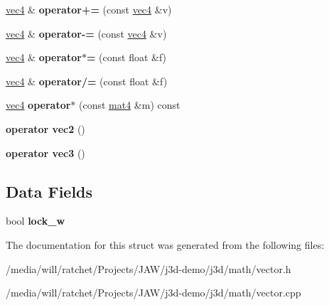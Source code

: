 \begin{DoxyCompactItemize}
\item 
\hypertarget{structj3d_1_1vec4_a8c4603ff2b8277bd6a4360ad5be1afa4}{}\hyperlink{structj3d_1_1vec4}{vec4} \& {\bfseries operator+=} (const \hyperlink{structj3d_1_1vec4}{vec4} \&v)\label{structj3d_1_1vec4_a8c4603ff2b8277bd6a4360ad5be1afa4}

\item 
\hypertarget{structj3d_1_1vec4_a3f19a869c701921bdc99595c0d4f1bd0}{}\hyperlink{structj3d_1_1vec4}{vec4} \& {\bfseries operator-\/=} (const \hyperlink{structj3d_1_1vec4}{vec4} \&v)\label{structj3d_1_1vec4_a3f19a869c701921bdc99595c0d4f1bd0}

\item 
\hypertarget{structj3d_1_1vec4_a26da4982d3addbd7e8ab0f91f7da7bf1}{}\hyperlink{structj3d_1_1vec4}{vec4} \& {\bfseries operator$\ast$=} (const float \&f)\label{structj3d_1_1vec4_a26da4982d3addbd7e8ab0f91f7da7bf1}

\item 
\hypertarget{structj3d_1_1vec4_ae39a4269070b65687523f014b8d69f49}{}\hyperlink{structj3d_1_1vec4}{vec4} \& {\bfseries operator/=} (const float \&f)\label{structj3d_1_1vec4_ae39a4269070b65687523f014b8d69f49}

\item 
\hypertarget{structj3d_1_1vec4_a0145a5bbf92b57e342afbe936e43b5f9}{}\hyperlink{structj3d_1_1vec4}{vec4} {\bfseries operator$\ast$} (const \hyperlink{structj3d_1_1mat4}{mat4} \&m) const \label{structj3d_1_1vec4_a0145a5bbf92b57e342afbe936e43b5f9}

\item 
\hypertarget{structj3d_1_1vec4_aee563255de9fe6b575fb66d132752cd9}{}{\bfseries operator vec2} ()\label{structj3d_1_1vec4_aee563255de9fe6b575fb66d132752cd9}

\item 
\hypertarget{structj3d_1_1vec4_a59a962535b369171441291c04b2b71df}{}{\bfseries operator vec3} ()\label{structj3d_1_1vec4_a59a962535b369171441291c04b2b71df}

\end{DoxyCompactItemize}
\subsection*{Data Fields}
\begin{DoxyCompactItemize}
\item 
\hypertarget{structj3d_1_1vec4_a56c19531d227dede7b22ef747c4e8f15}{}bool {\bfseries lock\+\_\+w}\label{structj3d_1_1vec4_a56c19531d227dede7b22ef747c4e8f15}

\end{DoxyCompactItemize}


The documentation for this struct was generated from the following files\+:\begin{DoxyCompactItemize}
\item 
/media/will/ratchet/\+Projects/\+J\+A\+W/j3d-\/demo/j3d/math/vector.\+h\item 
/media/will/ratchet/\+Projects/\+J\+A\+W/j3d-\/demo/j3d/math/vector.\+cpp\end{DoxyCompactItemize}
